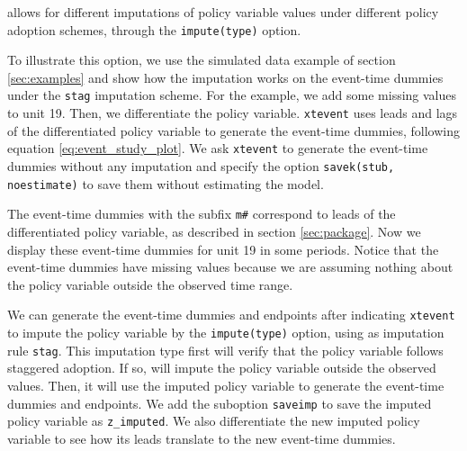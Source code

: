 \documentclass[bib]{./sty/statapress}
\begin{document}
\xtevent allows for different imputations of policy variable values under different policy adoption schemes, through the \texttt{impute(type)} option.

To illustrate this option, we use the simulated data example of section \ref{sec:examples} and show how the imputation works on the event-time dummies under the \texttt{stag} imputation scheme. For the example, we add some missing values to unit 19. Then, we differentiate the policy variable. \texttt{xtevent} uses leads and lags of the differentiated policy variable to generate the event-time dummies, following equation \eqref{eq:event_study_plot}. We ask \texttt{xtevent} to generate the event-time dummies without any imputation and specify the option \texttt{savek(stub, noestimate)} to save them without estimating the model.

\begin{stlog}
\nullskip
\end{stlog}

The event-time dummies with the subfix \texttt{m\#} correspond to leads of the differentiated policy variable, as described in section \ref{sec:package}. Now we display these event-time dummies for unit 19 in some periods. Notice that the event-time dummies have missing values because we are assuming nothing about the policy variable outside the observed time range.

\begin{stlog}
\nullskip
\end{stlog}

We can generate the event-time dummies and endpoints after indicating \texttt{xtevent} to impute the policy variable by the \texttt{impute(type)} option, using as imputation rule \texttt{stag}. This imputation type first will verify that the policy variable follows staggered adoption. If so, \xtevent will impute the policy variable outside the observed values. Then, it will use the imputed policy variable to generate the event-time dummies and endpoints. We add the suboption \texttt{saveimp} to save the imputed policy variable as \texttt{z\_imputed}. We also differentiate the new imputed policy variable to see how its leads translate to the new event-time dummies.

\begin{stlog}
\nullskip
\end{stlog}
\end{document}
